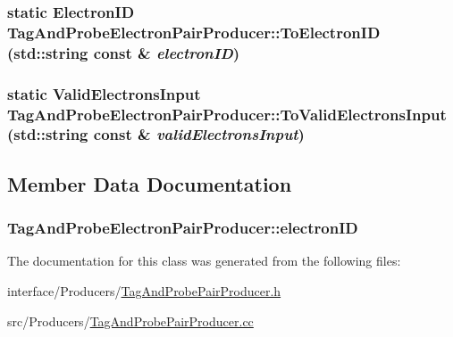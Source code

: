 \hypertarget{classTagAndProbeElectronPairProducer_a2c9fe72c7bef27a25b703bcc94486631}{
\subsubsection[{ToElectronID}]{\setlength{\rightskip}{0pt plus 5cm}static {\bf ElectronID} TagAndProbeElectronPairProducer::ToElectronID (std::string const \& {\em electronID})}}
\label{classTagAndProbeElectronPairProducer_a2c9fe72c7bef27a25b703bcc94486631}
\hypertarget{classTagAndProbeElectronPairProducer_a8e225e450795c93748853aae2db87617}{
\subsubsection[{ToValidElectronsInput}]{\setlength{\rightskip}{0pt plus 5cm}static {\bf ValidElectronsInput} TagAndProbeElectronPairProducer::ToValidElectronsInput (std::string const \& {\em validElectronsInput})}}
\label{classTagAndProbeElectronPairProducer_a8e225e450795c93748853aae2db87617}


\subsection{Member Data Documentation}
\hypertarget{classTagAndProbeElectronPairProducer_a7f5635442607a6ab2f0414729baeefe7}{
\subsubsection[{electronID}]{ {\bf TagAndProbeElectronPairProducer::electronID}}}
\label{classTagAndProbeElectronPairProducer_a7f5635442607a6ab2f0414729baeefe7}


The documentation for this class was generated from the following files:\begin{DoxyCompactItemize}
\item 
interface/Producers/\hyperlink{TagAndProbePairProducer_8h}{TagAndProbePairProducer.h}\item 
src/Producers/\hyperlink{TagAndProbePairProducer_8cc}{TagAndProbePairProducer.cc}\end{DoxyCompactItemize}
